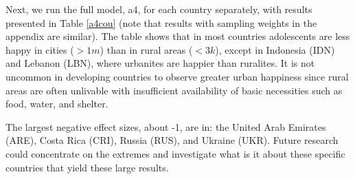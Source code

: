 \documentclass[10pt, letterpaper]{article}
\begin{document}
\begin{spacing}{1.4}
Next, we run the full model, a4, for each country separately, with results
presented in Table \ref{a4cou} (note that results with sampling weights in the appendix
are similar). The table shows that in most countries adolescents are less happy
in cities ($>1m$) than in rural areas ($<3k$), except in Indonesia (IDN) and
Lebanon (LBN), where urbanites are happier than ruralites. {It is not uncommon in developing countries to observe greater
urban happiness since rural areas are often unlivable with insufficient availability of basic necessities such as food, water, and shelter.}%
 
The largest negative effect sizes, about -1, are in: the United Arab Emirates (ARE), Costa Rica (CRI), Russia (RUS), and Ukraine (UKR). 
Future research could concentrate on the extremes and investigate what is it
about these specific countries that yield these large results. 


\end{spacing}
\end{document}
